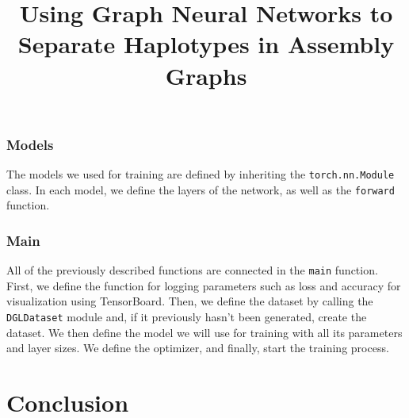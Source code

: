 \documentclass[times, utf8, diplomski, english]{fer_eng}
\begin{document}
\subsection{Models}

The models we used for training are defined by inheriting the \texttt{torch.nn.Module} class. In each model, we define the layers of the network, as well as the \texttt{forward} function.

\subsection{Main}

All of the previously described functions are connected in the \texttt{main} function. First, we define the function for logging parameters such as loss and accuracy for visualization using TensorBoard. Then, we define the dataset by calling the \texttt{DGLDataset} module and, if it previously hasn't been generated, create the dataset. We then define the model we will use for training with all its parameters and layer sizes. We define the optimizer, and finally, start the training process.

\chapter{Conclusion}




\clearpage

\title{Using Graph Neural Networks to Separate Haplotypes in Assembly Graphs}
\begin{abstract}

\keywords{}
\end{abstract}

\hrtitle{}
\begin{sazetak}

\kljucnerijeci{}
\end{sazetak}
\end{document}
